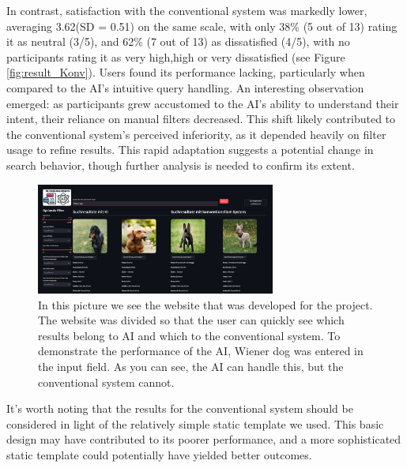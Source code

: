 \documentclass[../../submission.tex]{subfiles}
\begin{document}
In contrast, satisfaction with the conventional 
system was markedly lower, averaging 3.62(SD = 0.51) on the same scale, with only 38\% (5 out of 13) rating it as neutral (3/5), and 62\% 
(7 out of 13) as dissatisfied (4/5), with no participants rating it as very high,high or 
very dissatisfied (see Figure \ref{fig:result_Konv}). Users found its performance lacking, particularly when compared to the AI’s 
intuitive query handling. An interesting observation emerged: as participants grew 
accustomed to the AI’s ability to understand their intent, their reliance on manual 
filters decreased. This shift likely contributed to the conventional system’s perceived 
inferiority, as it depended heavily on filter usage to refine results. This rapid 
adaptation suggests a potential change in search behavior, though further analysis is 
needed to confirm its extent. 


\begin{figure}[h]
    \includegraphics[width=0.7\textwidth]{images/wiener_dog}
    \caption{In this picture we see the website that was developed for the project. The website was divided so that the user can quickly see which results belong to AI and which to the conventional system. To demonstrate the performance of the AI, Wiener dog was entered in the input field. As you can see, the AI can handle this, but the conventional system cannot.}
    \Description{}
    \label{fig:wiener_dog}
 \end{figure} 

 It’s worth noting that the results for the conventional 
system should be considered in light of the relatively simple static template we used. 
This basic design may have contributed to its poorer performance, and a more sophisticated 
static template could potentially have yielded better outcomes.
\end{document}
